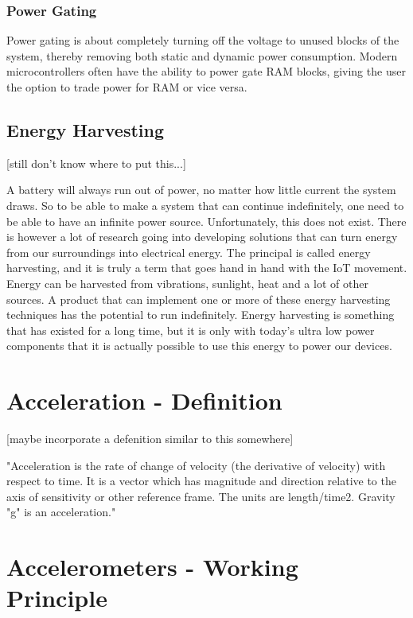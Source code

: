 \subsubsection{Power Gating}

Power gating is about completely turning off the voltage to unused blocks of the system, thereby removing both static and dynamic power consumption. Modern microcontrollers often have the ability to power gate RAM blocks, giving the user the option to trade power for RAM or vice versa.

\subsection{Energy Harvesting}

[still don't know where to put this...]

A battery will always run out of power, no matter how little current the system draws. So to be able to make a system that can continue indefinitely, one need to be able to have an infinite power source. Unfortunately, this does not exist. There is however a lot of research going into developing solutions that can turn energy from our surroundings into electrical energy. The principal is called energy harvesting, and it is truly a term that goes hand in hand with the IoT movement. Energy can be harvested from vibrations, sunlight, heat and a lot of other sources. A product that can implement one or more of these energy harvesting techniques has the potential to run indefinitely. Energy harvesting is something that has existed for a long time, but it is only with today's ultra low power components that it is actually possible to use this energy to power our devices.

\section{Acceleration - Definition}

[maybe incorporate a defenition similar to this somewhere]

"Acceleration is the rate of change of velocity (the derivative of velocity) with respect to time. It is a vector which has magnitude and direction relative to the axis of sensitivity or other reference frame. The units are length/time2. Gravity "g" is
an acceleration."

\section{Accelerometers - Working Principle} \label{sec:accel_working_principle}

